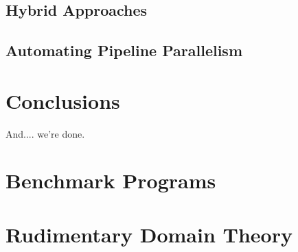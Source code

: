 \documentclass[dottedtoc, headinclude, footinclude=true, a4paper, numbers=noenddot]{scrreprt}
\begin{document}
        \section{Hybrid Approaches}
        
    
        \section{Automating Pipeline Parallelism}
    
    
    \chapter{Conclusions}
    \label{chap:conclusions}
    
        And.... we're done.


\begin{appendices}

\chapter{Benchmark Programs}

\chapter{Rudimentary Domain Theory}
\label{chap:domain}

\end{appendices}

\listoftodos[Notes]

\if@openright
  \cleardoublepage
\else
  \clearpage
\fi



\end{document}
